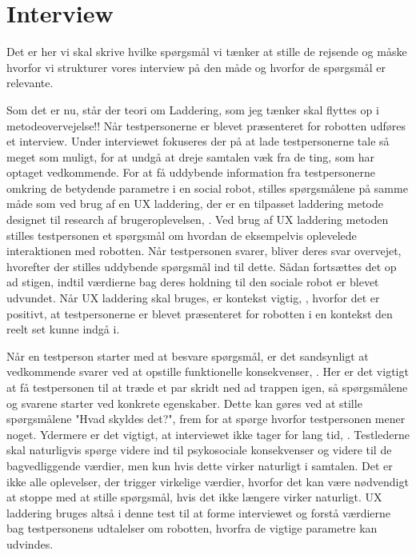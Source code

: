 \section{Interview}
\label{ParametreInterview}
%
Det er her vi skal skrive hvilke spørgsmål vi tænker at stille de rejsende og måske hvorfor vi strukturer vores interview på den måde og hvorfor de spørgsmål er relevante. 

Som det er nu, står der teori om Laddering, som jeg tænker skal flyttes op i metodeovervejelse!! \blankline
%
Når testpersonerne er blevet præsenteret for robotten udføres et interview. Under interviewet fokuseres der på at lade testpersonerne tale så meget som muligt, for at undgå at dreje samtalen væk fra de ting, som har optaget vedkommende. For at få uddybende information fra testpersonerne omkring de betydende parametre i en social robot, stilles spørgsmålene på samme måde som ved brug af en UX laddering, der er en tilpasset laddering metode designet til research af brugeroplevelsen, \parencite[ss. 3-4]{PDF:LadderingTheUserExperience}. Ved brug af UX laddering metoden stilles testpersonen et spørgsmål om hvordan de eksempelvis oplevelede interaktionen med robotten. Når testpersonen svarer, bliver deres svar overvejet, hvorefter der stilles uddybende spørgsmål ind til dette. Sådan fortsættes det op ad stigen, indtil værdierne bag deres holdning til den sociale robot er blevet udvundet. Når UX laddering skal bruges, er kontekst vigtig, \parencite[s. 3]{PDF:LadderingTheUserExperience}, hvorfor det er positivt, at testpersonerne er blevet præsenteret for robotten i en kontekst den reelt set kunne indgå i. 

Når en testperson starter med at besvare spørgsmål, er det sandsynligt at vedkommende svarer ved at opstille funktionelle konsekvenser, \parencite[s. 3]{PDF:LadderingTheUserExperience}. Her er det vigtigt at få testpersonen til at træde et par skridt ned ad trappen igen, så spørgsmålene og svarene starter ved konkrete egenskaber. Dette kan gøres ved at stille spørgsmålene "Hvad skyldes det?", frem for at spørge hvorfor testpersonen mener noget. Ydermere er det vigtigt, at interviewet ikke tager for lang tid, \parencite[s. 4]{PDF:LadderingTheUserExperience}. Testlederne skal naturligvis spørge videre ind til psykosociale konsekvenser og videre til de bagvedliggende værdier, men kun hvis dette virker naturligt i samtalen. Det er ikke alle oplevelser, der trigger virkelige værdier, hvorfor det kan være nødvendigt at stoppe med at stille spørgsmål, hvis det ikke længere virker naturligt. \blankline
%
UX laddering bruges altså i denne test til at forme interviewet og forstå værdierne bag testpersonens udtalelser om robotten, hvorfra de vigtige parametre kan udvindes.

